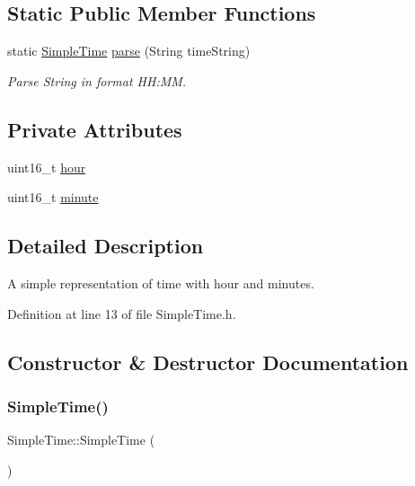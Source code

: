\subsection*{Static Public Member Functions}
\begin{DoxyCompactItemize}
\item 
static \mbox{\hyperlink{class_simple_time}{Simple\+Time}} \mbox{\hyperlink{class_simple_time_ad2d133f20de1ac63166308bc77906dfb}{parse}} (String time\+String)
\begin{DoxyCompactList}\small\item\em Parse String in format HH\+:MM. \end{DoxyCompactList}\end{DoxyCompactItemize}
\subsection*{Private Attributes}
\begin{DoxyCompactItemize}
\item 
uint16\+\_\+t \mbox{\hyperlink{class_simple_time_a3818c7ef3b2f7d685e403f6bbf993bdc}{hour}}
\item 
uint16\+\_\+t \mbox{\hyperlink{class_simple_time_ad8cfa601eddca64717e27a8ec95cddfa}{minute}}
\end{DoxyCompactItemize}


\subsection{Detailed Description}
A simple representation of time with hour and minutes. 

Definition at line 13 of file Simple\+Time.\+h.



\subsection{Constructor \& Destructor Documentation}
\mbox{\label{class_simple_time_adbc19913746c729324ba93d1efd82a0d}} 
\subsubsection{\texorpdfstring{SimpleTime()}{SimpleTime()}\hspace{0.1cm}{\footnotesize\ttfamily [1/4]}}
{\footnotesize\ttfamily Simple\+Time\+::\+Simple\+Time (\begin{DoxyParamCaption}{ }\end{DoxyParamCaption})\hspace{0.3cm}{\ttfamily [inline]}}



